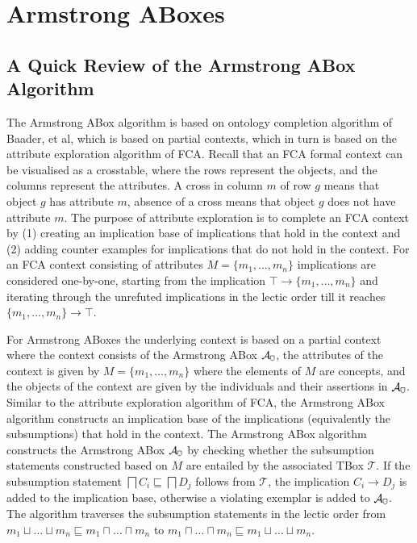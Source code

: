 \documentclass{amsart}
\title{}
\author{}
\date{}
\newcommand\armstrong[1][]{%
\tikzset{
    shield width/.store in=\shieldwidth,
    shield width=0.8ex,
    shield height/.store in=\shieldheight,
    shield height=1ex
}%
\tikz [baseline,#1] \draw (0,\shieldheight) -- (0,\shieldwidth/2) arc [radius=\shieldwidth/2, start angle=-180, end angle=0] -- (\shieldwidth,\shieldheight) -- cycle;%
}
\begin{document}
  \maketitle
  
  \section{Armstrong ABoxes}
  
  \subsection{A Quick Review of the Armstrong ABox Algorithm}
    The Armstrong ABox algorithm is based on ontology completion algorithm of Baader, et al, which is based on partial contexts, which in turn is based on the attribute exploration algorithm of FCA. Recall that an FCA formal context can be visualised as a crosstable, where the rows represent the objects, and the columns represent the attributes. A cross in column $m$ of row $g$ means that object $g$ has attribute $m$, absence of a cross means that object $g$ does not have attribute $m$.   
    The purpose of attribute exploration is to complete an FCA context by (1) creating an implication base of implications that hold in the context and (2) adding counter examples for implications that do not hold in the context. 
    For an FCA context consisting of attributes $M = \{m_1, \ldots, m_n\}$ implications are considered one-by-one, starting from the implication $\top \rightarrow \{m_1, \ldots, m_n\}$ and iterating through the unrefuted implications in the lectic order till it reaches $\{m_1, \ldots, m_n\} \rightarrow \top$. 
    
    
    For Armstrong ABoxes the underlying context is based on a partial context where the context consists of the Armstrong ABox $\mathcal{A}_{\armstrong}$, the attributes of the context is given by $M = \{m_1, \ldots, m_n\}$ where the elements of $M$ are concepts, and the objects of the context are given by the individuals and their assertions in $\mathcal{A}_{\armstrong}$. Similar to the attribute exploration algorithm of FCA, the Armstrong ABox algorithm constructs an implication base of the implications (equivalently the subsumptions) that hold in the context. The Armstrong ABox algorithm constructs the Armstrong ABox $\mathcal{A}_{\armstrong}$ by checking whether the subsumption statements constructed based on $M$ are entailed by the associated TBox $\mathcal{T}$. If the subsumption statement  $\bigsqcap C_i \sqsubseteq \bigsqcap D_ j$ follows from $\mathcal{T}$, the implication $C_i \rightarrow D_j$ is added to the implication base, otherwise a violating exemplar is added to $\mathcal{A}_{\armstrong}$. The algorithm traverses the subsumption statements in the lectic order from $m_1 \sqcup \ldots \sqcup m_n \sqsubseteq m_1 \sqcap \ldots \sqcap m_n$ to $m_1 \sqcap \ldots \sqcap m_n \sqsubseteq m_1 \sqcup \ldots \sqcup m_n$.   
  
\end{document}
